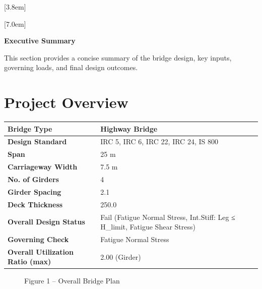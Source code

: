\documentclass[12pt,a4paper]{report}
\numberwithin{table}{chapter}
\numberwithin{figure}{chapter}
\begin{document}
[3.8em]
  {\normalfont}
  {\contentslabel{2.3em}}
  {\hspace*{-2.3em}}
  {\hfill\contentspage}

[7.0em]
  {\normalfont}
  {\contentslabel{3.2em}}
  {\hspace*{-3.2em}}
  {\hfill\contentspage}

\newpage
\renewcommand{\contentsname}{\centering\Large\bfseries Table of Contents}
\tableofcontents


\newpage
{\centering\Large\bfseries Executive Summary\par}
\vspace{0.8em}

This section provides a concise summary of the bridge design, key inputs, governing loads, and final design outcomes.

\section*{Project Overview}
\label{sec:project-overview}


\begin{tabular}{|L{5.5cm}|L{8.5cm}|}
\hline
\textbf{Bridge Type} & Highway Bridge \\
\hline
\textbf{Design Standard} & IRC 5, IRC 6, IRC 22, IRC 24, IS 800 \\
\hline
\textbf{Span} & 25 m \\
\hline
\textbf{Carriageway Width} & 7.5 m \\
\hline
\textbf{No. of Girders} & 4 \\
\hline
\textbf{Girder Spacing} & 2.1 \\
\hline
\textbf{Deck Thickness} & 250.0 \\
\hline
\textbf{Overall Design Status} & Fail (Fatigue Normal Stress, Int.Stiff:\allowbreak{} Leg ≤ H\_\allowbreak{}limit, Fatigue Shear Stress) \\
\hline
\textbf{Governing Check} & Fatigue Normal Stress \\
\hline
\textbf{Overall Utilization Ratio (max)} & 2.00 (Girder) \\
\hline
\end{tabular}


\begin{figure}[H]
\centering
{}
\caption*{Figure 1 -- Overall Bridge Plan}
\end{figure}
\end{document}
